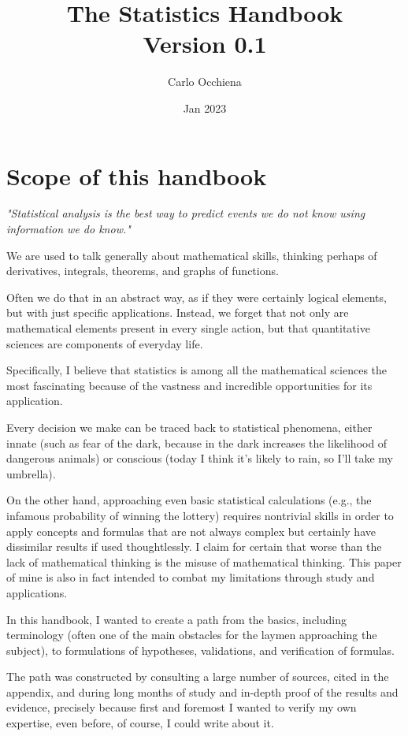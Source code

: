 \documentclass{article}
\title{The Statistics Handbook \\ 
    \normalsize Version 0.1}
\author{ Carlo Occhiena }
\date{ Jan 2023 }
\begin{document}
\fancyhead{}
\setlength{\headheight}{13.6pt}
\pagestyle{fancy}
\rhead[]{\rightmark} %

\maketitle
\tableofcontents
\clearpage

\section{Scope of this handbook}
\emph{"Statistical analysis is the best way to predict events we do not know using information we do know."} 


We are used to talk generally about mathematical skills, thinking perhaps of derivatives, integrals, theorems, and graphs of functions. 

Often we do that in an abstract way, as if they were certainly logical elements, but with just specific applications. Instead, we forget that not only are mathematical elements present in every single action, but that quantitative sciences are components of everyday life.

Specifically, I believe that statistics is among all the mathematical sciences the most fascinating because of the vastness and incredible opportunities for its application. 

Every decision we make can be traced back to statistical phenomena, either innate (such as fear of the dark, because in the dark increases the likelihood of dangerous animals) or conscious (today I think it's likely to rain, so I'll take my umbrella). 

On the other hand, approaching even basic statistical calculations (e.g., the infamous probability of winning the lottery) requires nontrivial skills in order to apply concepts and formulas that are not always complex but certainly have dissimilar results if used thoughtlessly. I claim for certain that worse than the lack of mathematical thinking is the misuse of mathematical thinking. This paper of mine is also in fact intended to combat my limitations through study and applications. 

In this handbook, I wanted to create a path from the basics, including terminology (often one of the main obstacles for the laymen approaching the subject), to formulations of hypotheses, validations, and verification of formulas.

The path was constructed by consulting a large number of sources, cited in the appendix, and during long months of study and in-depth proof of the results and evidence, precisely because first and foremost I wanted to verify my own expertise, even before, of course, I could write about it. 
\end{document}
